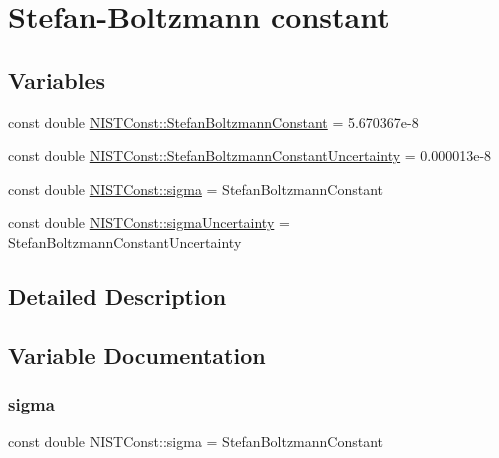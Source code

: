 \hypertarget{group___n_i_s_t_const-_stefan_boltzmann_constant}{}\section{Stefan-\/\+Boltzmann constant}
\label{group___n_i_s_t_const-_stefan_boltzmann_constant}
\subsection*{Variables}
\begin{DoxyCompactItemize}
\item 
const double \hyperlink{group___n_i_s_t_const-_stefan_boltzmann_constant_ga1094e420290686333202d186399d706d}{N\+I\+S\+T\+Const\+::\+Stefan\+Boltzmann\+Constant} = 5.\+670367e-\/8
\item 
const double \hyperlink{group___n_i_s_t_const-_stefan_boltzmann_constant_ga98b40b4f7ea1cd358d0a140bf8f6973c}{N\+I\+S\+T\+Const\+::\+Stefan\+Boltzmann\+Constant\+Uncertainty} = 0.\+000013e-\/8
\item 
const double \hyperlink{group___n_i_s_t_const-_stefan_boltzmann_constant_ga73dd51ea1c04650cc4d93c7a454c7b8f}{N\+I\+S\+T\+Const\+::sigma} = Stefan\+Boltzmann\+Constant
\item 
const double \hyperlink{group___n_i_s_t_const-_stefan_boltzmann_constant_ga0b88b9501b1c17b97f06de9ab7ba71f2}{N\+I\+S\+T\+Const\+::sigma\+Uncertainty} = Stefan\+Boltzmann\+Constant\+Uncertainty
\end{DoxyCompactItemize}


\subsection{Detailed Description}


\subsection{Variable Documentation}
\mbox{\label{group___n_i_s_t_const-_stefan_boltzmann_constant_ga73dd51ea1c04650cc4d93c7a454c7b8f}} 
\subsubsection{\texorpdfstring{sigma}{sigma}}
{\footnotesize\ttfamily const double N\+I\+S\+T\+Const\+::sigma = Stefan\+Boltzmann\+Constant}

